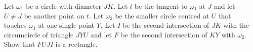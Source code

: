 Let $\omega_1$ be a circle with diameter $JK$.
Let $t$ be the tangent to $\omega_1$ at $J$ and let $U \neq J$ be another point on $t$.
Let $\omega_2$ be the smaller circle centred at $U$ that touches $\omega_1$ at one single point $Y$.
Let $I$ be the second intersection of $JK$ with the circumcircle of triangle $JYU$ and
let $F$ be the second intersection of $KY$ with $\omega_2$.
Show that $ FUJI $ is a rectangle.
